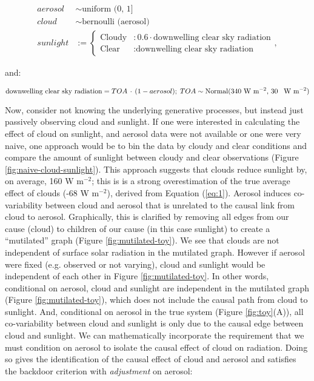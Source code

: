 \documentclass[12pt]{article}
\begin{document}
\begin{align}
  aerosol &\sim \text{uniform (0, 1]}\\
  cloud &\sim \text{bernoulli (aerosol)}\\
  sunlight &:= \begin{cases}
    \text{Cloudy} &: 0.6 \cdot \text{downwelling clear sky radiation}  \\
    \text{Clear} &: \text{downwelling clear sky radiation}
  \end{cases},
                   \label{eq:1}
\end{align}

and:

\begin{equation*}
  \text{downwelling clear sky radiation} = TOA \, \cdot \, (1 - aerosol); \;
  TOA \sim \text{Normal(340 W m$^{-2}$, 30 \, W m$^{-2}$)}
\end{equation*}

Now, consider not knowing the underlying generative processes, but
instead just passively observing cloud and sunlight. If one were
interested in calculating the effect of cloud on sunlight, and aerosol
data were not available or one were very naive, one approach would be
to bin the data by cloudy and clear conditions and compare the amount
of sunlight between cloudy and clear observations (Figure
\ref{fig:naive-cloud-sunlight}). This approach suggests that clouds
reduce sunlight by, on average, 160 W m$^{-2}$; this is is a strong
overestimation of the true average effect of clouds (-68 W m$^{-2}$),
derived from Equation (\ref{eq:1}). Aerosol induces co-variability
between cloud and aerosol that is unrelated to the causal link from
cloud to aerosol. Graphically, this is clarified by removing all edges
from our cause (cloud) to children of our cause (in this case
sunlight) to create a ``mutilated'' graph (Figure
\ref{fig:mutilated-toy}). We see that clouds are not independent of
surface solar radiation in the mutilated graph.  However if aerosol
were fixed (e.g. observed or not varying), cloud and sunlight would be
independent of each other in Figure \ref{fig:mutilated-toy}. In other
words, conditional on aerosol, cloud and sunlight are independent in
the mutilated graph (Figure \ref{fig:mutilated-toy}), which does not
include the causal path from cloud to sunlight. And, conditional on
aerosol in the true system (Figure \ref{fig:toy}(A)), all
co-variability between cloud and sunlight is only due to the causal
edge between cloud and sunlight.  We can mathematically incorporate
the requirement that we must condition on aerosol to isolate the
causal effect of cloud on radiation. Doing so gives the identification
of the causal effect of cloud and aerosol and satisfies the backdoor
criterion with \textit{adjustment} on aerosol:
\end{document}
